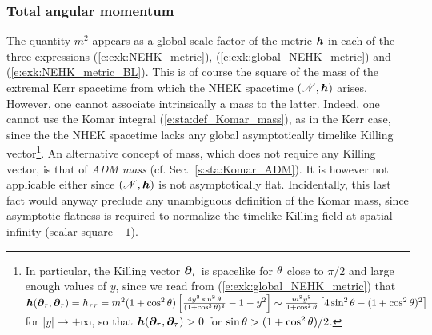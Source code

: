 \subsubsection{Total angular momentum}

The quantity $m^2$ appears as a global scale factor of the metric $\bm{h}$ in
each of the three expressions (\ref{e:exk:NEHK_metric}), (\ref{e:exk:global_NEHK_metric})
and (\ref{e:exk:NEHK_metric_BL}). This is of course the square of the mass of the extremal
Kerr spacetime from which the NHEK spacetime $(\mathscr{N},\bm{h})$ arises. However, one cannot
associate intrinsically a mass to the latter. Indeed, one cannot use the
Komar integral
(\ref{e:sta:def_Komar_mass}), as in the Kerr case, since the
the NHEK spacetime lacks any
global asymptotically timelike Killing vector\footnote{In particular, the Killing vector
$\bm{\partial}_\tau$ is spacelike for $\theta$ close to $\pi/2$ and large enough values of $y$, since
we read from (\ref{e:exk:global_NEHK_metric}) that
$\bm{h}(\bm{\partial}_\tau, \bm{\partial}_\tau) = h_{\tau\tau} = m^2 (1 + \cos^2\theta)
\left[ \frac{4 y^2 \sin^2\theta}{(1 + \cos^2\theta)^2} - 1 - y^2 \right]
\sim \frac{m^2 y^2}{1 + \cos^2\theta} \left[ 4 \sin^2\theta - (1 + \cos^2\theta)^2 \right]$
for $|y|\to +\infty$, so that $\bm{h}(\bm{\partial}_\tau, \bm{\partial}_\tau) > 0$ for
$\sin\theta > (1 + \cos^2\theta)/2$.}.
An alternative concept of mass, which does not require any Killing vector,
is that of \emph{ADM mass} (cf. Sec.~\ref{s:sta:Komar_ADM}).
It is however not applicable either since
$(\mathscr{N},\bm{h})$ is not asymptotically flat. Incidentally, this last fact would
anyway preclude any unambiguous definition of the Komar mass, since asymptotic flatness
is required to normalize the timelike Killing field  at spatial
infinity (scalar square $-1$).

